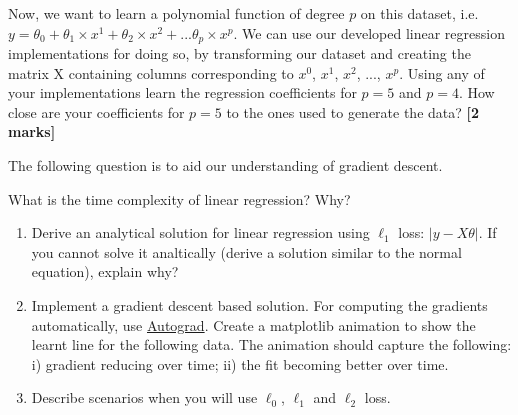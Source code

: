 \documentclass[colorlinks,linkcolor=true]{article}
\begin{document}
Now, we want to learn a polynomial function of degree $p$ on this dataset, i.e. $y = \theta_0 + \theta_1 \times x^1 + \theta_2 \times x^2 + ... \theta_p \times x^p $. We can use our developed linear regression implementations for doing so, by transforming our dataset and creating the matrix X containing columns corresponding to $x^0$, $x^1$, $x^2$, ..., $x^p$.
Using any of your implementations learn the regression coefficients for $p=5$ and $p=4$. How close are your coefficients for $p=5$ to the ones used to generate the data? \textbf{[2 marks]}

\item The following question is to aid our understanding of gradient descent. 
	
	\item What is the time complexity of linear regression? Why?
	\item \begin{enumerate}
		\item Derive an analytical solution for linear regression using $\ell_1$ loss: $|y-X\theta|$. If you cannot solve it analtically (derive a solution similar to the normal equation), explain why? 
		\item Implement a gradient descent based solution. For computing the gradients automatically, use \href{https://github.com/HIPS/autograd}{Autograd}. Create a matplotlib animation to show the learnt line for the following data. The animation should capture the following: i) gradient reducing over time; ii) the fit becoming better over time.
		\item Describe scenarios when you will use $\ell_0$, $\ell_1$ and $\ell_2$ loss.
	\end{enumerate}
\end{document}
